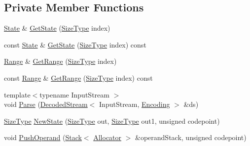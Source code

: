 \subsection*{Private Member Functions}
\begin{DoxyCompactItemize}
\item 
\mbox{\hyperlink{structrapidjson_1_1internal_1_1_generic_regex_1_1_state}{State}} \& \mbox{\hyperlink{classrapidjson_1_1internal_1_1_generic_regex_aa276484850fd24cee9eebaf359213ce9}{Get\+State}} (\mbox{\hyperlink{namespacerapidjson_a44eb33eaa523e36d466b1ced64b85c84}{Size\+Type}} index)
\item 
const \mbox{\hyperlink{structrapidjson_1_1internal_1_1_generic_regex_1_1_state}{State}} \& \mbox{\hyperlink{classrapidjson_1_1internal_1_1_generic_regex_ad62b2f960e536254b74c0f8c07e13ca5}{Get\+State}} (\mbox{\hyperlink{namespacerapidjson_a44eb33eaa523e36d466b1ced64b85c84}{Size\+Type}} index) const
\item 
\mbox{\hyperlink{structrapidjson_1_1internal_1_1_generic_regex_1_1_range}{Range}} \& \mbox{\hyperlink{classrapidjson_1_1internal_1_1_generic_regex_a627d69f51b55974cff295a099c9f31e1}{Get\+Range}} (\mbox{\hyperlink{namespacerapidjson_a44eb33eaa523e36d466b1ced64b85c84}{Size\+Type}} index)
\item 
const \mbox{\hyperlink{structrapidjson_1_1internal_1_1_generic_regex_1_1_range}{Range}} \& \mbox{\hyperlink{classrapidjson_1_1internal_1_1_generic_regex_a9b258d46c901a546452b97f707eeedee}{Get\+Range}} (\mbox{\hyperlink{namespacerapidjson_a44eb33eaa523e36d466b1ced64b85c84}{Size\+Type}} index) const
\item 
{\footnotesize template$<$typename Input\+Stream $>$ }\\void \mbox{\hyperlink{classrapidjson_1_1internal_1_1_generic_regex_a9cc3606d931a530fc9c2619cf266f789}{Parse}} (\mbox{\hyperlink{classrapidjson_1_1internal_1_1_decoded_stream}{Decoded\+Stream}}$<$ Input\+Stream, \mbox{\hyperlink{classrapidjson_1_1_encoding}{Encoding}} $>$ \&ds)
\item 
\mbox{\hyperlink{namespacerapidjson_a44eb33eaa523e36d466b1ced64b85c84}{Size\+Type}} \mbox{\hyperlink{classrapidjson_1_1internal_1_1_generic_regex_a839d53a5bc8ada62f9fbdb98476b41b9}{New\+State}} (\mbox{\hyperlink{namespacerapidjson_a44eb33eaa523e36d466b1ced64b85c84}{Size\+Type}} out, \mbox{\hyperlink{namespacerapidjson_a44eb33eaa523e36d466b1ced64b85c84}{Size\+Type}} out1, unsigned codepoint)
\item 
void \mbox{\hyperlink{classrapidjson_1_1internal_1_1_generic_regex_a25fc94cc939350af3112ed14f1086ab6}{Push\+Operand}} (\mbox{\hyperlink{classrapidjson_1_1internal_1_1_stack}{Stack}}$<$ \mbox{\hyperlink{classrapidjson_1_1_allocator}{Allocator}} $>$ \&operand\+Stack, unsigned codepoint)

\end{DoxyCompactItemize}
